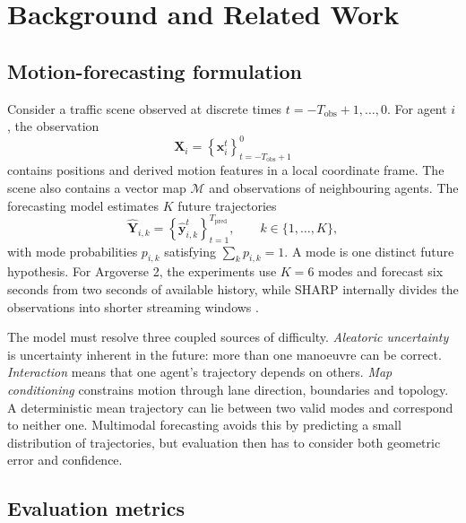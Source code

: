 \chapter{Background and Related Work}
\label{chap:background}

\section{Motion-forecasting formulation}

Consider a traffic scene observed at discrete times $t=-T_{\mathrm{obs}}+1,\ldots,0$. For agent $i$, the observation
\begin{equation}
    \mathbf{X}_i = \left\{\mathbf{x}_i^t\right\}_{t=-T_{\mathrm{obs}}+1}^{0}
\end{equation}
contains positions and derived motion features in a local coordinate frame. The scene also contains a vector map $\mathcal{M}$ and observations of neighbouring agents. The forecasting model estimates $K$ future trajectories
\begin{equation}
    \hat{\mathbf{Y}}_{i,k} = \left\{\hat{\mathbf{y}}_{i,k}^{t}\right\}_{t=1}^{T_{\mathrm{pred}}},
    \qquad k\in\{1,\ldots,K\},
\end{equation}
with mode probabilities $p_{i,k}$ satisfying $\sum_k p_{i,k}=1$. A mode is one distinct future hypothesis. For Argoverse 2, the experiments use $K=6$ modes and forecast six seconds from two seconds of available history, while SHARP internally divides the observations into shorter streaming windows \cite{wilson2021av2,prutsch2026sharp}.

The model must resolve three coupled sources of difficulty. \emph{Aleatoric uncertainty} is uncertainty inherent in the future: more than one manoeuvre can be correct. \emph{Interaction} means that one agent's trajectory depends on others. \emph{Map conditioning} constrains motion through lane direction, boundaries and topology. A deterministic mean trajectory can lie between two valid modes and correspond to neither one. Multimodal forecasting avoids this by predicting a small distribution of trajectories, but evaluation then has to consider both geometric error and confidence.

\section{Evaluation metrics}

